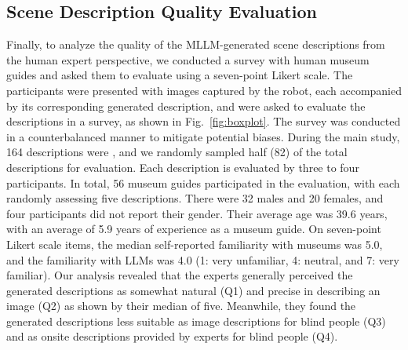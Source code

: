 


\subsection{Scene Description Quality Evaluation}
\label{sec:quality_eval}
Finally, to analyze the quality of the MLLM-generated scene descriptions from the human expert perspective, we conducted a survey with human museum guides and asked them to evaluate using a seven-point Likert scale. 
The participants were presented with images captured by the robot, each accompanied by its corresponding generated description, and were asked to evaluate the descriptions in a survey, as shown in Fig.~\ref{fig:boxplot}. 
The survey was conducted in a counterbalanced manner to mitigate potential biases.
During the main study, 164 descriptions were , and we randomly sampled half (82) of the total descriptions for evaluation.
Each description is evaluated by three to four participants.
In total, 56 museum guides participated in the evaluation, with each randomly assessing five descriptions. 
There were 32 males and 20 females, and four participants did not report their gender.
Their average age was 39.6 years, with an average of 5.9 years of experience as a museum guide. 
On seven-point Likert scale items, the median self-reported familiarity with museums was 5.0, and the familiarity with LLMs was 4.0 (1: very unfamiliar, 4: neutral, and 7: very familiar).
Our analysis revealed that the experts generally perceived the generated descriptions as somewhat natural (Q1) and precise in describing an image (Q2) as shown by their median of five.
Meanwhile, they found the generated descriptions less suitable as image descriptions for blind people (Q3) and as onsite descriptions provided by experts for blind people (Q4).



